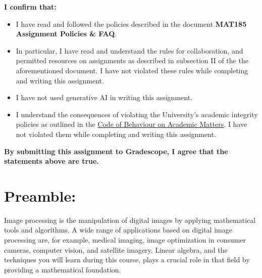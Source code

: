 \documentclass[10pt,addpoints]{exam} %
\begin{document}
\vspace*{0.1in}


\bigskip
\large \textbf{I confirm that:}
\normalsize

\begin{itemize} 
\item I have read and followed the policies described in the document {\bf
    MAT185 Assignment Policies \& FAQ}.
\item In particular, I have read and understand the rules for
  collaboration, and permitted resources on assignments as described in
  subsection II of the the aforementioned document. I have not violated
  these rules while completing and writing this assignment.
\item I have not used generative AI in writing this assignment.
\item I understand the consequences of violating the University's academic
  integrity policies as outlined in the
  \href{http://www.governingcouncil.utoronto.ca/policies/behaveac.htm}{Code of
    Behaviour on Academic Matters}. I have not violated them while completing
  and writing this assignment.
\end{itemize}
\bigskip

\large \textbf{By submitting this assignment to Gradescope, I agree that the
  statements above are true.}  \normalsize

\newpage

\section*{Preamble:}

Image processing is the manipulation of digital images by applying mathematical tools and
algorithms. A wide range of applications based on digital image processing are, for example, medical
imaging, image optimization in consumer cameras, computer vision, and satellite imagery. Linear
algebra, and the techniques you will learn during this course, plays a crucial role in that field by
providing a mathematical foundation.\\
\end{document}
